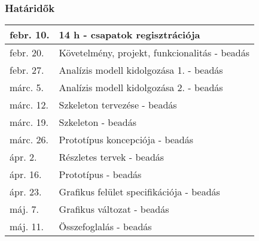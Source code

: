     \subsubsection{Határidők}
	\begin{center}
	\begin{tabular*}{0.65\textwidth}{@{\extracolsep{\fill}} | l | l | }
		\hline
		febr. 10. & 14 h - csapatok regisztrációja\\
		\hline
		febr. 20. & Követelmény, projekt, funkcionalitás - beadás\\
		\hline
		febr. 27. & Analízis modell kidolgozása 1. - beadás\\
		\hline
		márc. 5. & Analízis modell kidolgozása 2. - beadás\\
		\hline
		márc. 12. & Szkeleton tervezése - beadás\\
		\hline
		márc. 19. & Szkeleton - beadás\\
		\hline
		márc. 26. & Prototípus koncepciója - beadás\\
		\hline
		ápr. 2. & Részletes tervek - beadás\\
		\hline
		ápr. 16. & Prototípus - beadás\\
		\hline
		ápr. 23. & Grafikus felület specifikációja - beadás\\
		\hline
		máj. 7. & Grafikus változat - beadás\\
		\hline
		máj. 11. & Összefoglalás - beadás\\
		\hline
	\end{tabular*}
	\end{center}

